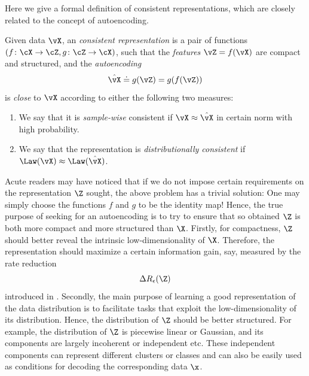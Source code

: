 \documentclass[../../book-main.tex]{subfiles}
\begin{document}
Here we give a formal definition of consistent representations, which
are closely related to the concept of autoencoding. %
\begin{definition}\label{def:bidirectional_rep}
  Given data \(\vX\), an \textit{consistent representation} is a pair
  of functions \((f \colon \cX \to \cZ, g \colon \cZ \to \cX)\), such
  that the \textit{features} \(\vZ = f(\vX)\) are compact and
  structured, and the \textit{autoencoding} \[\hat{\vX} \doteq g(\vZ)
  = g(f(\vZ))\] is \textit{close} to \(\vX\) according to either the
  following two measures:
  \begin{enumerate}
    \item We say that it is \textit{sample-wise} consistent if \(\vX
      \approx \hat{\vX}\) in certain norm with high probability.
    \item We say that the representation is \textit{distributionally
      consistent} if \(\Law(\vX) \approx \Law(\hat{\vX})\).
  \end{enumerate}
\end{definition}

Acute readers may have noticed that if we do not impose certain
requirements on the representation $\Z$ sought, the above problem has
a trivial solution: One may simply choose the functions $f$ and $g$
to be the identity map! Hence, the true purpose of seeking for an
autoencoding is to try to ensure that so obtained $\Z$ is both more
compact and more structured than $\X$. Firstly, for compactness, $\Z$
should better reveal the intrinsic low-dimensionality of $\X$.
Therefore, the representation should maximize a certain information
gain, say, measured by the rate reduction
\begin{equation}
  \Delta R_{\epsilon}(\Z)
\end{equation}
introduced in . Secondly, the main purpose of
learning a good representation of the data distribution is to
facilitate tasks that exploit the low-dimensionality of its
distribution. Hence, the distribution of $\Z$ should be better
structured. For example, the distribution of $\Z$ is piecewise linear
or Gaussian, and its components are largely incoherent or independent
etc. These independent components can represent different clusters or
classes and can also be easily used as conditions for decoding the
corresponding data $\x$.
\end{document}
